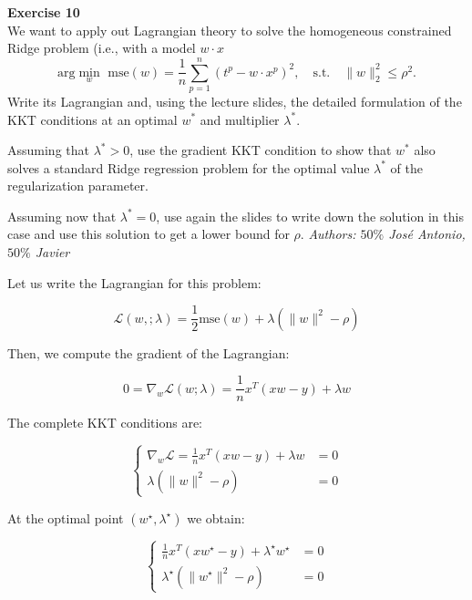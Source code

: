 \documentclass[11pt,table]{article}
\newenvironment{problem}[2][Exercise]
{ \begin{mdframed}[backgroundcolor=gray!20] \textbf{#1 #2} \\}
	{\hspace{0.0cm}\newline\newline \emph{Authors: \(50\%\) José Antonio, \(50\%\) Javier}  \end{mdframed}}
\newcommand\norm[1]{\lVert#1\rVert}
\begin{document}


\begin{problem}{10}
We want to apply out Lagrangian theory to solve the homogeneous constrained Ridge problem (i.e., with a model \(w\cdot x\)
\[
	\text{arg}\min_{w} \text{ mse}(w) = \frac{1}{n} \sum_{p=1}^n (t^p - w \cdot x^p)^2, \quad \text{s.t.} \quad \norm{w}_2^2 \leq \rho^2.
\]
Write its Lagrangian and, using the lecture slides, the detailed formulation of the KKT conditions at an optimal \(w^*\) and multiplier \(\lambda^*\).

Assuming that \(\lambda^* > 0\), use the gradient KKT condition to show that \(w^*\) also solves a standard Ridge regression problem for the optimal value \(\lambda^*\) of the regularization parameter.

Assuming now that \(\lambda^* = 0\), use again the slides to write down the solution in this case and use this solution to get a lower bound for \(\rho\).
\end{problem}

Let us write the Lagrangian for this problem:

\[
	\mathcal L(w, ; \lambda) = \frac{1}{2} \text{mse}(w) + \lambda \left(\parallel w \parallel^2 - \rho\right)
\]

Then, we compute the gradient of the Lagrangian:

\[
	0 = \nabla_w \mathcal L(w; \lambda) = \frac{1}{n}x^T(xw - y) + \lambda w
\]

The complete KKT conditions are:

\begin{equation*}
	\begin{cases}
		\nabla_w \mathcal L = \frac{1}{n}x^T(xw - y) + \lambda w & = 0 \\
		\lambda \left(\parallel w \parallel^2 - \rho\right)      & = 0
	\end{cases}
\end{equation*}

At the optimal point $(w^\star, \lambda^\star)$ we obtain:

\begin{equation}
	\label{eq10}
	\begin{cases}
		\frac{1}{n}x^T(xw^\star - y) + \lambda^\star w^\star            & = 0 \\
		\lambda^\star \left(\parallel w^\star \parallel^2 - \rho\right) & = 0
	\end{cases}
\end{equation}
\end{document}
